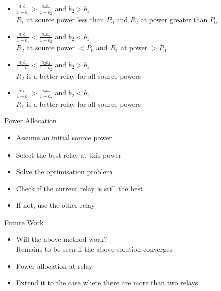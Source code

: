 \documentclass{beamer}
\begin{document}
\begin{frame}
	\begin{itemize}
		\item $\frac{a_1b_1}{1+b_1} >	\frac{a_2b_2}{1+b_2}$ and $b_2 > b_1$ \\
			$R_1$ at source power less than  $P_0$ and $R_2$ at power greater than $P_0$
		\item $\frac{a_1b_1}{1+b_1} < \frac{a_2b_2}{1+b_2}$ and $b_2 < b_1$ \\
			$R_2$ at source power $<P_0$ and $R_1$ at power $>P_0$
		\item $\frac{a_1b_1}{1+b_1} < \frac{a_2b_2}{1+b_2}$ and $b_2 > b_1$ \\
			$R_2$ is a better relay for all source powers
		\item $\frac{a_1b_1}{1+b_1} >	\frac{a_2b_2}{1+b_2}$ and $b_2 < b_1$ \\
			$R_1$ is a better relay for all source powers
	\end{itemize}
\end{frame}

\begin{frame}{Power Allocation}
	\vspace{1cm}
	\begin{itemize}  
		\item
			Assume an initial source power
		\item Select the best relay at this power
		\item Solve the optimisation problem
		\item Check if the current relay is still the best
		\item If not, use the other relay
	\end{itemize}
\end{frame}


\begin{frame}{Future Work}
	\vspace{1cm}
	\begin{itemize}  
		\item
			Will the above method work? \\
			Remains to be seen if the above solution converges
			\vspace{1cm}
			\pause
	
		\item Power allocation at relay
			\vspace{1cm}
			\pause
		\item Extend it to the case where there are more than two relays
	\end{itemize}
\end{frame}
\end{document}
